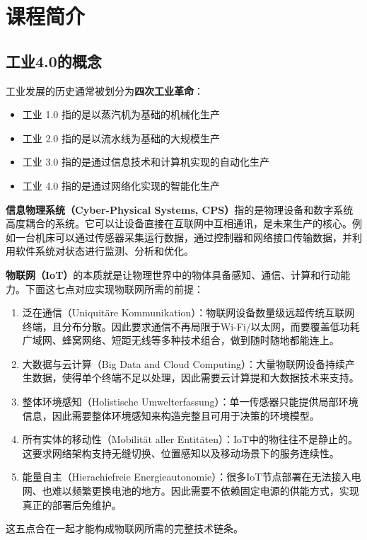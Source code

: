 \section{课程简介}

\subsection{工业4.0的概念}

工业发展的历史通常被划分为\textbf{四次工业革命}：
\begin{itemize}
    \item 工业 1.0 指的是以蒸汽机为基础的机械化生产
    \item 工业 2.0 指的是以流水线为基础的大规模生产
    \item 工业 3.0 指的是通过信息技术和计算机实现的自动化生产
    \item 工业 4.0 指的是通过网络化实现的智能化生产
\end{itemize}

\textbf{信息物理系统（Cyber-Physical Systems, CPS）}指的是物理设备和数字系统高度耦合的系统。它可以让设备直接在互联网中互相通讯，是未来生产的核心。例如一台机床可以通过传感器采集运行数据，通过控制器和网络接口传输数据，并利用软件系统对状态进行监测、分析和优化。

\textbf{物联网（IoT）}的本质就是让物理世界中的物体具备感知、通信、计算和行动能力。下面这七点对应实现物联网所需的前提：
\begin{enumerate}
    \item 泛在通信（Uniquitäre Kommunikation）：物联网设备数量级远超传统互联网终端，且分布分散。因此要求通信不再局限于Wi-Fi/以太网，而要覆盖低功耗广域网、蜂窝网络、短距无线等多种技术组合，做到随时随地都能连上。
    \item 大数据与云计算（Big Data and Cloud Computing）：大量物联网设备持续产生数据，使得单个终端不足以处理，因此需要云计算提和大数据技术来支持。
    \item 整体环境感知（Holistische Umwelterfassung）：单一传感器只能提供局部环境信息，因此需要整体环境感知来构造完整且可用于决策的环境模型。
    \item 所有实体的移动性（Mobilität aller Entitäten）：IoT中的物往往不是静止的。这要求网络架构支持无缝切换、位置感知以及移动场景下的服务连续性。
    \item 能量自主（Hierachiefreie Energieautonomie）：很多IoT节点部署在无法接入电网、也难以频繁更换电池的地方。因此需要不依赖固定电源的供能方式，实现真正的部署后免维护。
\end{enumerate}
这五点合在一起才能构成物联网所需的完整技术链条。